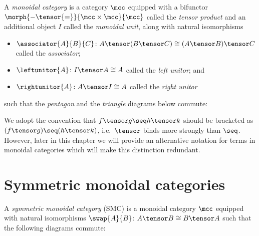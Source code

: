 \begin{definition}
    A \emph{monoidal category} is a category \(\mcc\) equipped with a
    bifunctor \(\morph{{-} \tensor {=}}{\mcc \times \mcc}{\mcc}\) called the
    \emph{tensor product} and an additional object \(I\) called the
    \emph{monoidal unit},
    along with natural isomorphisms
    \begin{itemize}
        \item \(
            \associator{A}{B}{C}
            \colon
            A \tensor (B \tensor C)
            \cong
            (A \tensor B) \tensor C
            \) called the \emph{associator};
        \item \(
            \leftunitor{A}
            \colon
            I \tensor A
            \cong
            A
            \) called the \emph{left unitor}; and
        \item \(
            \rightunitor{A}
            \colon
            A \tensor I
            \cong
            A
            \) called the \emph{right unitor}
    \end{itemize}
    such that the \emph{pentagon} and the \emph{triangle} diagrams below
    commute:
    \begin{center}
        
        
    \end{center}
\end{definition}

We adopt the convention that \(f \tensor g \seq h \tensor k\) should be
bracketed as \((f \tensor g) \seq (h \tensor k)\), i.e.\ \(\tensor\) binds
more strongly than \(\seq\).
However, later in this chapter we will provide an alternative notation for terms
in monoidal categories which will make this distinction redundant.

\section{Symmetric monoidal categories}


\begin{definition}
    A \emph{symmetric monoidal category} (SMC) is a monoidal category \(\mcc\)
    equipped with natural isomorphisms \(
        \swap{A}{B} \colon A \tensor B \cong B \tensor A
    \) such that the following diagrams commute:
    \begin{center}
        
        

        \vspace{1em}

        
    \end{center}
\end{definition}

